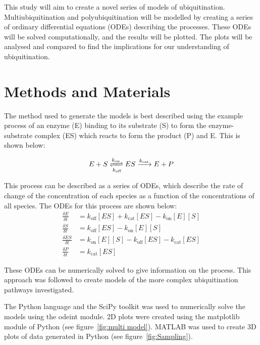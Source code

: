 \documentclass[11pt]{article}
\begin{document}
This study will aim to create a novel series of models of ubiquitination. Multiubiquitination and polyubiquitination will be modelled by creating a series of ordinary differential equations (ODEs) describing the processes. These ODEs will be solved computationally, and the results will be plotted. The plots will be analysed and compared to find the implications for our understanding of ubiquitination.


\section{Methods and Materials}

The method used to generate the models is best described using the example process of an enzyme (E) binding to its substrate (S) to form the enzyme-substrate complex (ES) which reacts to form the product (P) and E. This is shown below:

\begin{equation}
  E + S \xrightleftharpoons[k_\text{off}]{k_\text{on}} ES
  \xrightarrow[{}]{k_\text{cat}} E + P
\end{equation}

This process can be described as a series of ODEs, which describe the rate of change of the concentration of each species as a function of the concentrations of all species. The ODEs for this process are shown below:
\begin{align}
 \frac{\delta E}{\delta t} &= k_\text{off}[ES] + k_\text{cat}[ES] - k_\text{on}[E][S] \\
 \frac{\delta S}{\delta t} &= k_\text{off}[ES] - k_\text{on}[E][S] \\
 \frac{\delta ES}{\delta t} &= k_\text{on}[E][S] - k_\text{off}[ES] - k_\text{cat}[ES] \\
 \frac{\delta P}{\delta t} &= k_\text{cat}[ES]
\end{align}

These ODEs can be numerically solved to give information on the process. This approach was followed to create models of the more complex ubiquitination pathways investigated.

The Python language \cite{Rossum:1995:PRM:869369} and the SciPy toolkit \cite{scipy2001} was used to numerically solve the models using the odeint module. 2D plots were created using the matplotlib module of Python (see figure~\ref{fig:multi model}). MATLAB\cite{MATLAB:2010} was used to create 3D plots of data generated in Python (see figure~\ref{fig:Sampling}).
\end{document}
